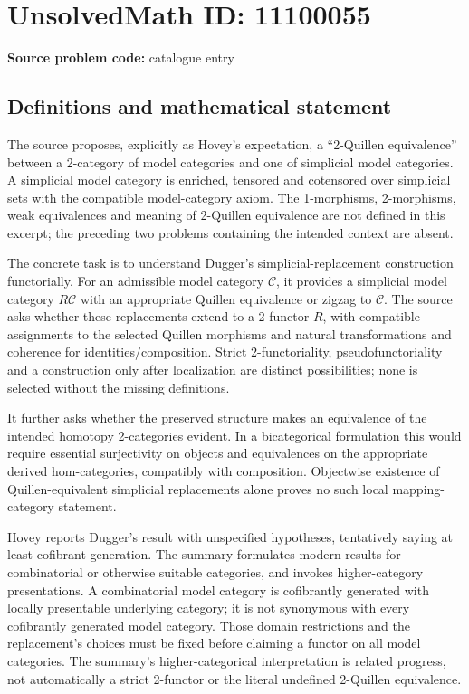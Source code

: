 \documentclass[11pt]{article}
\begin{document}
\section*{UnsolvedMath ID: 11100055}
\textbf{Source problem code:} catalogue entry
\subsection{Definitions and mathematical statement}
The source proposes, explicitly as Hovey's expectation, a ``2-Quillen equivalence'' between a 2-category of model categories and one of simplicial model categories. A simplicial model category is enriched, tensored and cotensored over simplicial sets with the compatible model-category axiom. The 1-morphisms, 2-morphisms, weak equivalences and meaning of 2-Quillen equivalence are not defined in this excerpt; the preceding two problems containing the intended context are absent.

The concrete task is to understand Dugger's simplicial-replacement construction functorially. For an admissible model category \(\mathcal C\), it provides a simplicial model category \(R\mathcal C\) with an appropriate Quillen equivalence or zigzag to \(\mathcal C\). The source asks whether these replacements extend to a 2-functor \(R\), with compatible assignments to the selected Quillen morphisms and natural transformations and coherence for identities/composition. Strict 2-functoriality, pseudofunctoriality and a construction only after localization are distinct possibilities; none is selected without the missing definitions.

It further asks whether the preserved structure makes an equivalence of the intended homotopy 2-categories evident. In a bicategorical formulation this would require essential surjectivity on objects and equivalences on the appropriate derived hom-categories, compatibly with composition. Objectwise existence of Quillen-equivalent simplicial replacements alone proves no such local mapping-category statement.

Hovey reports Dugger's result with unspecified hypotheses, tentatively saying at least cofibrant generation. The summary formulates modern results for combinatorial or otherwise suitable categories, and invokes higher-category presentations. A combinatorial model category is cofibrantly generated with locally presentable underlying category; it is not synonymous with every cofibrantly generated model category. Those domain restrictions and the replacement's choices must be fixed before claiming a functor on all model categories. The summary's higher-categorical interpretation is related progress, not automatically a strict 2-functor or the literal undefined 2-Quillen equivalence.
\end{document}
